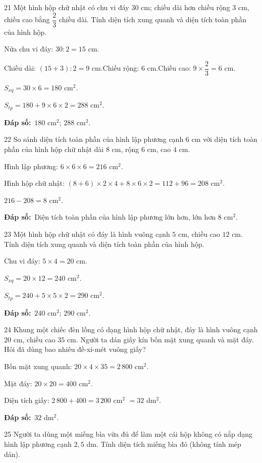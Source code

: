 \documentclass[11pt]{article}
\newif\ifsol \solfalse
\providecommand{\AnsWord}{Đáp số}
\newcommand{\dapso}[1]{\par\textbf{\AnsWord:}\ #1}
\newcommand{\probsol}[1]{%
  \begin{lrbox}{\solmeasure}\begin{minipage}{\dimexpr\linewidth-24pt\relax}#1\end{minipage}\end{lrbox}%
  \ifsol
    \begin{solbox}#1\end{solbox}%
  \else
    \setlength{\solht}{\dimexpr\ht\solmeasure+\dp\solmeasure+0.85cm\relax}%
    \ifdim\solht<1.35cm\setlength{\solht}{1.35cm}\fi
    \begin{tcolorbox}[colback=white,colframe=Line,boxrule=0.8pt,arc=5pt,
      left=8pt,right=8pt,top=4pt,bottom=4pt,height=\solht]{\footnotesize\color{Slate}\itshape\WorkWord}\end{tcolorbox}%
  \fi}
\newcommand{\gap}{\vspace{0.3cm}}
\def\WorkWord{Bài làm:}
\def\AnsWord{Đáp số}
\begin{document}
\gap
\begin{probbox}{21}{\relax}
Một hình hộp chữ nhật có chu vi đáy $30$ cm; chiều dài hơn chiều rộng $3$ cm, chiều cao bằng $\dfrac23$ chiều dài. Tính diện tích xung quanh và diện tích toàn phần của hình hộp.
\end{probbox}
\probsol{
Nửa chu vi đáy: $30:2=15$ cm.\par
Chiều dài: $(15+3):2=9$ cm.\quad Chiều rộng: $6$ cm.\quad Chiều cao: $9\times\dfrac23=6$ cm.\par
$S_{xq}=30\times6=180$ cm$^2$.\par
$S_{tp}=180+9\times6\times2=288$ cm$^2$.
\dapso{$180$ cm$^2$; $288$ cm$^2$.}}
\gap
\begin{probbox}{22}{\relax}
So sánh diện tích toàn phần của hình lập phương cạnh $6$ cm với diện tích toàn phần của hình hộp chữ nhật dài $8$ cm, rộng $6$ cm, cao $4$ cm.
\end{probbox}
\probsol{
Hình lập phương: $6\times6\times6=216$ cm$^2$.\par
Hình hộp chữ nhật: $(8+6)\times2\times4+8\times6\times2=112+96=208$ cm$^2$.\par
$216-208=8$ cm$^2$.
\dapso{Diện tích toàn phần của hình lập phương lớn hơn, lớn hơn $8$ cm$^2$.}}
\gap
\begin{probbox}{23}{\relax}
Một hình hộp chữ nhật có đáy là hình vuông cạnh $5$ cm, chiều cao $12$ cm. Tính diện tích xung quanh và diện tích toàn phần của hình hộp.
\end{probbox}
\probsol{
Chu vi đáy: $5\times4=20$ cm.\par
$S_{xq}=20\times12=240$ cm$^2$.\par
$S_{tp}=240+5\times5\times2=290$ cm$^2$.
\dapso{$240$ cm$^2$; $290$ cm$^2$.}}
\gap
\begin{probbox}{24}{\relax}
Khung một chiếc đèn lồng có dạng hình hộp chữ nhật, đáy là hình vuông cạnh $20$ cm, chiều cao $35$ cm. Người ta dán giấy kín bốn mặt xung quanh và mặt đáy. Hỏi đã dùng bao nhiêu đề-xi-mét vuông giấy?
\end{probbox}
\probsol{
Bốn mặt xung quanh: $20\times4\times35=2\,800$ cm$^2$.\par
Mặt đáy: $20\times20=400$ cm$^2$.\par
Diện tích giấy: $2\,800+400=3\,200$ cm$^2$ $=32$ dm$^2$.
\dapso{$32$ dm$^2$.}}
\gap
\begin{probbox}{25}{\relax}
Người ta dùng một miếng bìa vừa đủ để làm một cái hộp không có nắp dạng hình lập phương cạnh $2{,}5$ dm. Tính diện tích miếng bìa đó (không tính mép dán).
\end{probbox}
\end{document}
